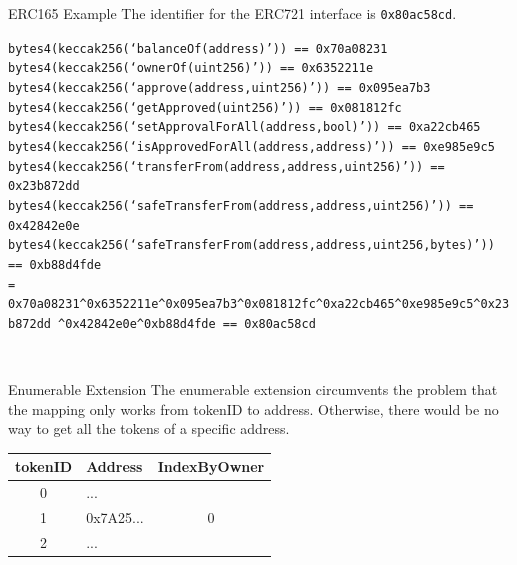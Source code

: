 \documentclass[handout]{beamer}
\begin{document}
\begin{frame}{ERC165 Example}
The identifier for the ERC721 interface is \texttt{0x80ac58cd}.\\
\vspace{0.5em}
\begin{scriptsize}
\texttt{bytes4(keccak256(‘balanceOf(address)’)) == 0x70a08231
bytes4(keccak256(‘ownerOf(uint256)’)) == 0x6352211e
bytes4(keccak256(‘approve(address,uint256)’)) == 0x095ea7b3
bytes4(keccak256(‘getApproved(uint256)’)) == 0x081812fc
bytes4(keccak256(‘setApprovalForAll(address,bool)’)) == 0xa22cb465
bytes4(keccak256(‘isApprovedForAll(address,address)’)) == 0xe985e9c5
bytes4(keccak256(‘transferFrom(address,address,uint256)’)) == 0x23b872dd
bytes4(keccak256(‘safeTransferFrom(address,address,uint256)’)) == 0x42842e0e
bytes4(keccak256(‘safeTransferFrom(address,address,uint256,bytes)’)) == 0xb88d4fde}
\vspace{0.5em} \\
\texttt{= 0x70a08231\textasciicircum 0x6352211e\textasciicircum 0x095ea7b3\textasciicircum 0x081812fc\textasciicircum 0xa22cb465\textasciicircum 0xe985e9c5\textasciicircum 0x23b872dd \textasciicircum 0x42842e0e\textasciicircum 0xb88d4fde == 0x80ac58cd}
\end{scriptsize}
\vspace{0.5em} \\
\end{frame}

\begin{frame}{Enumerable Extension}
The enumerable extension circumvents the problem that the mapping only works from tokenID to address. Otherwise, there would be no way to get all the tokens of a specific address.
\vspace{0.5em}
		\begin{table}
			\begin{tabular}{c|l|c}
			tokenID & Address & IndexByOwner\\
			\hline
			0 & \color{focus}{0x0901}... & \color{focus}{0} \\
			1 & 0x7A25... & 0 \\
			2 & \color{focus}{0x0901}... & \color{focus}{1}
			\end{tabular}
		\end{table}
\end{frame}
\end{document}
